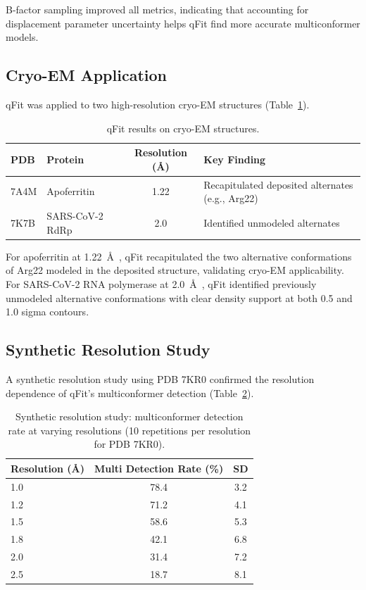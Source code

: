 \documentclass[11pt]{article}
\begin{document}
B-factor sampling improved all metrics, indicating that accounting for displacement parameter uncertainty helps qFit find more accurate multiconformer models.

\subsection{Cryo-EM Application}

qFit was applied to two high-resolution cryo-EM structures (Table~\ref{tab:cryoem}).

\begin{table}[H]
\centering
\caption{qFit results on cryo-EM structures.}
\label{tab:cryoem}
\begin{tabular}{llcl}
\toprule
PDB & Protein & Resolution (\AA) & Key Finding \\
\midrule
7A4M & Apoferritin & 1.22 & Recapitulated deposited alternates (e.g., Arg22) \\
7K7B & SARS-CoV-2 RdRp & 2.0 & Identified unmodeled alternates \\
\bottomrule
\end{tabular}
\end{table}

For apoferritin at 1.22~\AA\ \citep{apoferritin_structure2020}, qFit recapitulated the two alternative conformations of Arg22 modeled in the deposited structure, validating cryo-EM applicability. For SARS-CoV-2 RNA polymerase at 2.0~\AA\ \citep{sars_rdrp2021}, qFit identified previously unmodeled alternative conformations with clear density support at both 0.5 and 1.0 sigma contours.

\subsection{Synthetic Resolution Study}

A synthetic resolution study using PDB 7KR0 confirmed the resolution dependence of qFit's multiconformer detection (Table~\ref{tab:synthetic}).

\begin{table}[H]
\centering
\caption{Synthetic resolution study: multiconformer detection rate at varying resolutions (10 repetitions per resolution for PDB 7KR0).}
\label{tab:synthetic}
\begin{tabular}{lcc}
\toprule
Resolution (\AA) & Multi Detection Rate (\%) & SD \\
\midrule
1.0 & 78.4 & 3.2 \\
1.2 & 71.2 & 4.1 \\
1.5 & 58.6 & 5.3 \\
1.8 & 42.1 & 6.8 \\
2.0 & 31.4 & 7.2 \\
2.5 & 18.7 & 8.1 \\
\bottomrule
\end{tabular}
\end{table}
\end{document}
